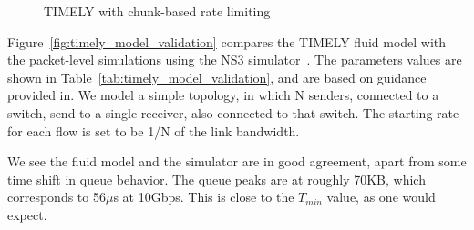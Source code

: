\begin{figure}[t]
\center
{}
\caption{TIMELY with chunk-based rate limiting}
\label{fig:timely_sim_bursty}
\end{figure}


Figure~\ref{fig:timely_model_validation} compares the TIMELY fluid model with
the packet-level simulations using the NS3 simulator~\cite{ns3}. The parameters
values are shown in Table~\ref{tab:timely_model_validation}, and are based on
guidance provided in\cite{timely}.  We model a simple topology, in which N
senders, connected to a switch, send to a single receiver, also connected to
that switch. The starting rate for each flow is set to be 1/N of the link
bandwidth. 

We see the fluid model and the simulator are in good agreement, apart from some
time shift in queue behavior. The queue peaks are at roughly 70KB, which
corresponds to 56$\mu$s at 10Gbps. This is close to the $T_{min}$ value, as one
would expect.


